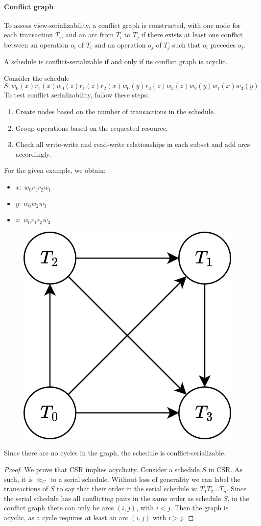 \paragraph*{Conflict graph}
To assess view-serializability, a conflict graph is constructed, with one node for each transaction $T_i$, and an arc from $T_i$ to $T_j$ if there exists at least one conflict between an operation $o_i$ of $T_i$ and an operation $o_j$ of $T_j$ such that $o_i$ precedes $o_j$.
\begin{theorem}
    A schedule is conflict-serializable if and only if its conflict graph is acyclic.
\end{theorem}
\begin{example}
    Consider the schedule 
    \[S: w_0(x) r_1(x) w_0(z) r_1(z) r_2(x) w_0(y) r_3(z) w_3(z) w_2(y) w_1(x) w_3(y)\]
    To test conflict serializability, follow these steps:
    \begin{enumerate}
        \item Create nodes based on the number of transactions in the schedule.
        \item Group operations based on the requested resource.
        \item Check all write-write and read-write relationships in each subset and add arcs accordingly. 
    \end{enumerate}
    For the given example, we obtain:
    \begin{itemize}
        \item $x:\:w_0 r_1 r_2 w_1$
        \item $y:\: w_0 w_2 w_3$
        \item $z:\:w_0 r_1 r_3 w_3$
    \end{itemize}
    \begin{figure}[H]
        \centering
        \includegraphics[width=0.25\linewidth]{images/conflict.png}
    \end{figure}
    Since there are no cycles in the graph, the schedule is conflict-serializable.
\end{example}
\begin{proof}
    We prove that CSR implies acyclicity. 
    Consider a schedule $S$ in CSR. 
    As such, it is $\approx_C$ to a serial schedule. 
    Without loss of generality we can label the transactions of $S$ to say that their order in the serial schedule is: $T_1 T_2 \dots T_n$.
    Since the serial schedule has all conflicting pairs in the same order as schedule $S$, in the conflict graph there can only be arcs $(i,j)$, with $i<j$. 
    Then the graph is acyclic, as a cycle requires at least an arc $(i,j)$ with $i>j$.
\end{proof}

